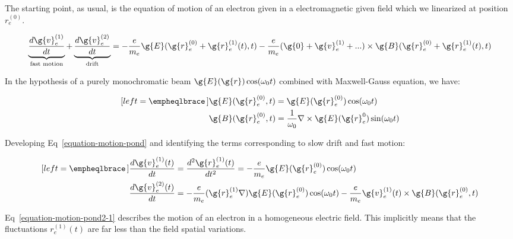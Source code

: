 \noindent The starting point, as usual, is the equation of motion of an electron given in a electromagnetic given field which we linearized at position $r_e^{(0)}$.

\begin{equation}
\label{equation-motion-pond}
\underbrace{\frac{d\g{v}_e^{(1)}}{dt}}_{\text{fast motion}}+\underbrace{\frac{d\g{v}_e^{(2)}}{dt}}_{\text{drift}}=-\frac{e}{m_e}\g{E}(\g{r}_e^{(0)} + \g{r}_e^{(1)}(t),t)-\frac{e}{m_e}(\g{0}+\g{v}_e^{(1)}+...)\times \g{B}(\g{r}_e^{(0)}+\g{r}_e^{(1)}(t),t)
\end{equation}

\noindent In the hypothesis of a purely monochromatic beam $\g{E}(\g{r})\cos(\omega_0 t)$ combined with Maxwell-Gauss equation, we have:

\begin{subequations}
\label{equation-motion-pond2}
\begin{align}[left = \empheqlbrace\,]
&\g{E}(\g{r}_e^{(0)},t) = \g{E}(\g{r}_e^{(0)})\cos(\omega_0 t)\\
&\g{B}(\g{r}_e^{(0)},t) = \frac{1}{\omega_0}\nabla\times \g{E}(\g{r}_e^{0})\sin(\omega_0 t)
\end{align}
\end{subequations}

\noindent Developing Eq~\ref{equation-motion-pond} and identifying the terms corresponding to slow drift and fast motion:

\begin{subequations}
\label{equation-motion-pond2}
\begin{align}[left = \empheqlbrace\,]
&\frac{d\g{v}_e^{(1)}(t)}{dt}= \frac{d^2\g{r}_e^{(1)}(t)}{dt^2} =  -\frac{e}{m_e} \g{E}(\g{r}_e^{(0)})\cos(\omega_0 t)\label{equation-motion-pond2-1}\\
&\frac{d\g{v}_e^{(2)}(t)}{dt}=  -\frac{e}{m_e}(\g{r}_e^{(1)}\nabla ) \g{E}(\g{r}_e^{(0)})\cos(\omega_0 t)- \frac{e}{m_e}\g{v}_e^{(1)}(t)\times \g{B}(\g{r}_e^{(0)},t)\label{equation-motion-pond2-2}
\end{align}
\end{subequations}

\noindent Eq~\ref{equation-motion-pond2-1} describes the motion of an electron in a homogeneous electric field. This implicitly means that the fluctuations $r_e^{(1)}(t)$ are far less than the field spatial variations.



